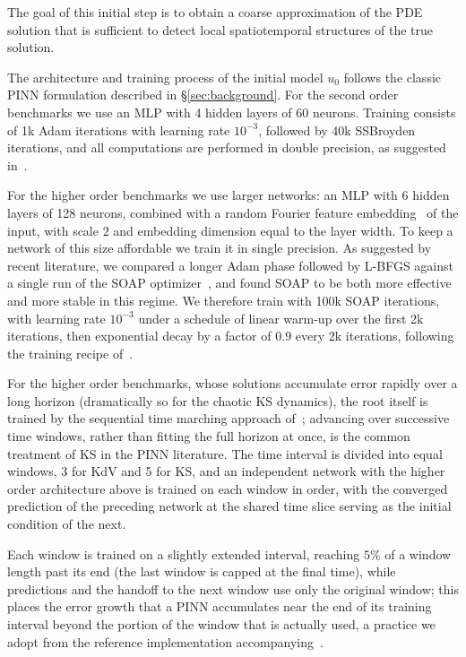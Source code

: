 The goal of this initial step is to obtain a coarse approximation of the PDE solution that is sufficient to detect local spatiotemporal structures of the true solution.

The architecture and training process of the initial model $u_0$ follows the classic PINN formulation described in
\S\ref{sec:background}. For the second order benchmarks we use an MLP with 4 hidden layers of 60 neurons. Training consists of 1k Adam iterations
with learning rate $10^{-3}$, followed by 40k SSBroyden iterations, and all computations are performed in
double precision, as suggested in~\cite{kiyani2025optimizer}.

For the higher order benchmarks we use larger networks: an MLP with 6 hidden layers of 128 neurons, combined with a random Fourier feature embedding~\cite{tancik2020fourier} of the input, with scale $2$ and embedding dimension equal to the layer width. To keep a network of this size affordable we train it in single precision. As suggested by recent literature, we compared a longer Adam phase followed by L-BFGS against a single run of the SOAP optimizer~\cite{vyas2024soap,wang2025gradient}, and found SOAP to be both more effective and more stable in this regime. We therefore train with 100k SOAP iterations, with learning rate $10^{-3}$ under a schedule of linear warm-up over the first 2k iterations, then exponential decay by a factor of $0.9$ every 2k iterations, following the training recipe of~\cite{wang2023expert}.

For the higher order benchmarks, whose solutions accumulate error rapidly over a long horizon (dramatically so for the chaotic KS dynamics), the root itself is trained by the sequential time marching approach of~\cite{wight2021timeadaptive}; advancing over successive time windows, rather than fitting the full horizon at once, is the common treatment of KS in the PINN literature. The time interval is divided into equal windows, 3 for KdV and 5 for KS, and an independent network with the higher order architecture above is trained on each window in order, with the converged prediction of the preceding network at the shared time slice serving as the initial condition of the next.

Each window is trained on a slightly extended interval, reaching $5\%$ of a window length past its end (the last window is capped at the final time), while predictions and the handoff to the next window use only the original window; this places the error growth that a PINN accumulates near the end of its training interval beyond the portion of the window that is actually used, a practice we adopt from the reference implementation accompanying~\cite{wang2023expert}.

